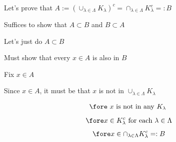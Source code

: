 \begin{frame}

    Let's prove that $A := \left( \cup_{\lambda \in \Lambda} K_{\lambda}  \right)^{c}
    = \cap_{\lambda \in \Lambda} K_{\lambda}^{c} =: B$

    Suffices to show that $A \subset B$ and $B \subset A$  

    Let's just do  $A \subset B$

    Must show that every $x \in A$ is also in $B$

    Fix $x \in A$ 
    
    Since $x \in A$, it must be that $x$ is not in $\cup_{\lambda \in \Lambda} K_{\lambda}$

    \begin{equation*}
        \fore \text{ $x$ is not in any $K_{\lambda}$ }
    \end{equation*}
    \vspace{-0.3em}
    \begin{equation*}
        \fore x \in K_{\lambda}^c \text{ for each } \lambda \in \Lambda
    \end{equation*}
    \vspace{-0.3em}
    \begin{equation*}
        \fore x \in \cap_{\lambda \in \Lambda} K_{\lambda}^{c} =: B
    \end{equation*}

    
\end{frame}








